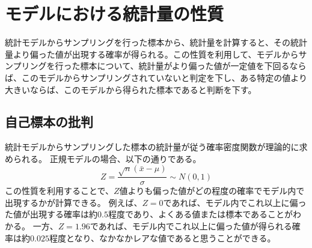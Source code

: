 \chapter{モデルにおける統計量の性質}
統計モデルからサンプリングを行った標本から、統計量を計算すると、その統計量より偏った値が出現する確率が得られる。この性質を利用して、モデルからサンプリングを行った標本について、統計量がより偏った値が一定値を下回るならば、このモデルからサンプリングされていないと判定を下し、ある特定の値より大きいならば、このモデルから得られた標本であると判断を下す。



\section{自己標本の批判}
統計モデルからサンプリングした標本の統計量が従う確率密度関数が理論的に求められる。
正規モデルの場合、以下の通りである。
\begin{equation*}
    Z = \frac{\sqrt{n}(\bar{x}-\mu)}{\sigma} \sim N(0,1)
\end{equation*}
この性質を利用することで、$Z$値よりも偏った値がどの程度の確率でモデル内で出現するかが計算できる。
例えば、$Z=0$であれば、モデル内でこれ以上に偏った値が出現する確率は約$0.5$程度であり、よくある値または標本であることがわかる。
一方、$Z=1.96$であれば、モデル内でこれ以上に偏った値が得られる確率は約$0.025$程度となり、なかなかレアな値であると思うことができる。



